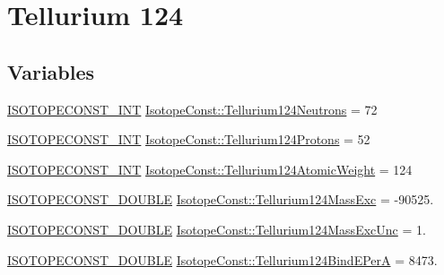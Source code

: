 \hypertarget{group___isotope_const-_tellurium-_te124}{}\section{Tellurium 124}
\label{group___isotope_const-_tellurium-_te124}
\subsection*{Variables}
\begin{DoxyCompactItemize}
\item 
\mbox{\hyperlink{group___isotope_const-_macros_ga5f18360b3e99483a35c32d789e62621c}{I\+S\+O\+T\+O\+P\+E\+C\+O\+N\+S\+T\+\_\+\+I\+NT}} \mbox{\hyperlink{group___isotope_const-_tellurium-_te124_gacbe08317563899a2254aafa0cc58729c}{Isotope\+Const\+::\+Tellurium124\+Neutrons}} = 72
\item 
\mbox{\hyperlink{group___isotope_const-_macros_ga5f18360b3e99483a35c32d789e62621c}{I\+S\+O\+T\+O\+P\+E\+C\+O\+N\+S\+T\+\_\+\+I\+NT}} \mbox{\hyperlink{group___isotope_const-_tellurium-_te124_gab623c448bffeaf0e2c4ebed3e0405d97}{Isotope\+Const\+::\+Tellurium124\+Protons}} = 52
\item 
\mbox{\hyperlink{group___isotope_const-_macros_ga5f18360b3e99483a35c32d789e62621c}{I\+S\+O\+T\+O\+P\+E\+C\+O\+N\+S\+T\+\_\+\+I\+NT}} \mbox{\hyperlink{group___isotope_const-_tellurium-_te124_ga3782aa4922f42b1e85ca38114cf3f93d}{Isotope\+Const\+::\+Tellurium124\+Atomic\+Weight}} = 124
\item 
\mbox{\hyperlink{group___isotope_const-_macros_ga8f45a7272ce02c0b4c65c44636ed719a}{I\+S\+O\+T\+O\+P\+E\+C\+O\+N\+S\+T\+\_\+\+D\+O\+U\+B\+LE}} \mbox{\hyperlink{group___isotope_const-_tellurium-_te124_gae2e573e035f67fc7f7ef920cf328bb75}{Isotope\+Const\+::\+Tellurium124\+Mass\+Exc}} = -\/90525.
\item 
\mbox{\hyperlink{group___isotope_const-_macros_ga8f45a7272ce02c0b4c65c44636ed719a}{I\+S\+O\+T\+O\+P\+E\+C\+O\+N\+S\+T\+\_\+\+D\+O\+U\+B\+LE}} \mbox{\hyperlink{group___isotope_const-_tellurium-_te124_gaa3af81fa62605b521632d3fbb95edc56}{Isotope\+Const\+::\+Tellurium124\+Mass\+Exc\+Unc}} = 1.
\item 
\mbox{\hyperlink{group___isotope_const-_macros_ga8f45a7272ce02c0b4c65c44636ed719a}{I\+S\+O\+T\+O\+P\+E\+C\+O\+N\+S\+T\+\_\+\+D\+O\+U\+B\+LE}} \mbox{\hyperlink{group___isotope_const-_tellurium-_te124_gaaa9e4bb70bd9358ff78453388e6ea1c7}{Isotope\+Const\+::\+Tellurium124\+Bind\+E\+PerA}} = 8473.
\item 

\end{DoxyCompactItemize}
